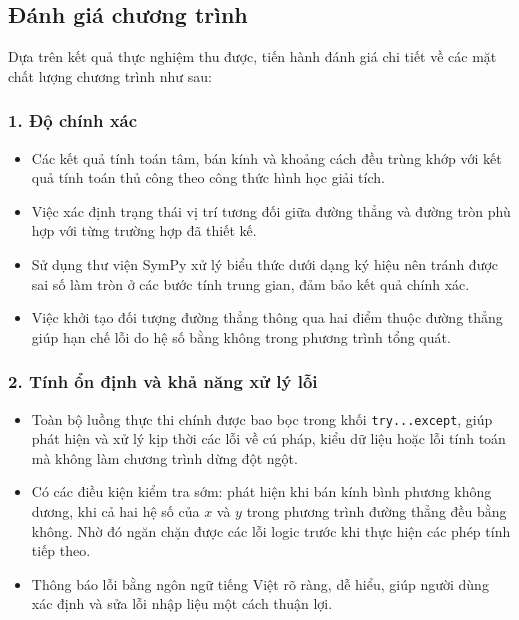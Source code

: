 \documentclass[12pt,a4paper]{article}
\begin{document}
\subsection{Đánh giá chương trình}
Dựa trên kết quả thực nghiệm thu được, tiến hành đánh giá chi tiết về các mặt chất lượng chương trình như sau:

\subsubsection*{1. Độ chính xác}
\begin{itemize}
    \item Các kết quả tính toán tâm, bán kính và khoảng cách đều trùng khớp với kết quả tính toán thủ công theo công thức hình học giải tích.
    \item Việc xác định trạng thái vị trí tương đối giữa đường thẳng và đường tròn phù hợp với từng trường hợp đã thiết kế.
    \item Sử dụng thư viện SymPy xử lý biểu thức dưới dạng ký hiệu nên tránh được sai số làm tròn ở các bước tính trung gian, đảm bảo kết quả chính xác.
    \item Việc khởi tạo đối tượng đường thẳng thông qua hai điểm thuộc đường thẳng giúp hạn chế lỗi do hệ số bằng không trong phương trình tổng quát.
\end{itemize}

\subsubsection*{2. Tính ổn định và khả năng xử lý lỗi}
\begin{itemize}
    \item Toàn bộ luồng thực thi chính được bao bọc trong khối \texttt{try...except}, giúp phát hiện và xử lý kịp thời các lỗi về cú pháp, kiểu dữ liệu hoặc lỗi tính toán mà không làm chương trình dừng đột ngột.
    \item Có các điều kiện kiểm tra sớm: phát hiện khi bán kính bình phương không dương, khi cả hai hệ số của $x$ và $y$ trong phương trình đường thẳng đều bằng không. Nhờ đó ngăn chặn được các lỗi logic trước khi thực hiện các phép tính tiếp theo.
    \item Thông báo lỗi bằng ngôn ngữ tiếng Việt rõ ràng, dễ hiểu, giúp người dùng xác định và sửa lỗi nhập liệu một cách thuận lợi.
\end{itemize}
\end{document}
